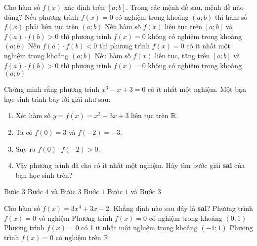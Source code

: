 \begin{ex}%
	Cho hàm số $f(x)$ xác định trên $[a;b]$. Trong các mệnh đề sau, mệnh đề nào đúng?
	\choice
	{Nếu phương trình $f(x)=0$ có nghiệm trong khoảng $(a;b)$ thì hàm số $f(x)$ phải liên tục trên $(a;b)$}
	{Nếu hàm số $f(x)$ liên tục trên $[a;b]$ và $f(a)\cdot f(b) >0$ thì phương trình $f(x)=0$ không có nghiệm trong khoảng $(a;b)$}
	{Nếu $f(a) \cdot f(b)<0$ thì phương trình $f(x)=0$ có ít nhất một nghiệm trong khoảng $(a;b)$}
	{\True Nếu hàm số $f(x)$ liên tục, tăng trên $[a;b]$ và $f(a) \cdot f(b)>0$ thì phương trình $f(x) =0$ không có nghiệm trong khoảng $(a;b)$}
\end{ex}

\begin{ex}%
Chứng minh rằng phương trình $x^3-x+3=0$ có ít nhất một nghiệm. Một bạn học sinh trình bày lời giải như sau:
\begin{enumerate}[Bước 1.]
\item Xét hàm số $y=f(x)=x^3-3x+3$ liên tục trên $\Bbb{R}$.
\item Ta có $f(0)=3$ và $f(-2)=-3$.
\item Suy ra $f(0)\cdot f(-2)>0$.
\item Vậy phương trình đã cho có ít nhất một nghiệm. Hãy tìm bước giải {\bf sai} của bạn học sinh trên?
\end{enumerate}
	\choice
	{\True Bước $3$}
	{Bước $4$ và Bước $3$}
	{Bước $1$}
	{Bước $1$ và Bước $3$}
\end{ex}


\begin{ex}%
	Cho hàm số $f(x)=3x^4+3x-2$. Khẳng định nào sau đây là {\bf sai}?
	\choice
	{\True Phương trình $f(x)=0$ vô nghiệm}
	{Phương trình $f(x)=0$ có nghiệm trong khoảng $(0;1)$}
	{Phương trình $f(x)=0$ có 1 it nhất một nghiệm trong khoảng $(-1;1)$}
	{Phương trình $f(x)=0$ có nghiệm trên $\mathbb{R}$}
\end{ex}

